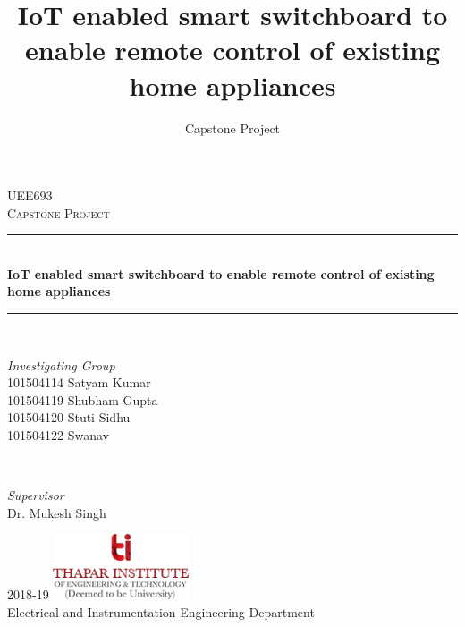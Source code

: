 \documentclass[12pt,a4paper,titlepage,twoside]{book}
\title{ IoT enabled smart switchboard to enable remote control of existing home appliances }
\author{Capstone Project}
\begin{document}
    \begin{titlepage} 
    	\newcommand{\HRule}{\rule{\linewidth}{0.4mm}}
    	\centering 
    	\textsc{\Large UEE693}\\[0.5cm] 
    	\textsc{\large Capstone Project}\\[0.5cm]
    	\HRule\\[0.4cm]
    	{\huge\bfseries IoT enabled smart switchboard to enable remote control of existing home appliances}\\[0.4cm]
    	\HRule\\[1.5cm]
    	\vfill
    	\begin{minipage}{0.5\textwidth}
    		\begin{flushleft}
    			\large
    			\textit{Investigating Group}\\[0.25cm]
    			101504114 Satyam Kumar\\
    			101504119 Shubham Gupta\\
    			101504120 Stuti Sidhu\\
    			101504122 Swanav\\
    		\end{flushleft}
    	\end{minipage}
    	~
    	\begin{minipage}{0.4\textwidth}
    		\begin{flushright}
    			\large
    			\textit{Supervisor}\\
    			Dr. Mukesh Singh
    		\end{flushright}
    	\end{minipage}
    	\vfill\vfill\vfill
    	{\large 2018-19}		
    	\vfill\vfill
    	\includegraphics[width=0.3\textwidth]{logo.png}\\
    	Electrical and Instrumentation Engineering Department\\
    \end{titlepage}
    
    \tableofcontents
    \newpage
    \frontmatter
	    
	    
	    
	    
	    
	    \newpage
	    
        
    \mainmatter
	    
	    
	    
	    
	    
	    
  
    \backmatter
    	
    	
    	
\end{document}
